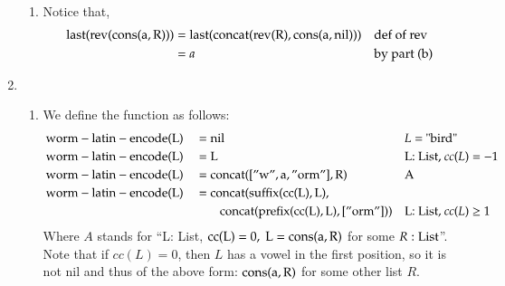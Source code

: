 \documentclass[12pt]{article}
\theoremstyle{definitionstyle}
\DeclareMathOperator{\wormlatinencode}{worm-latin-encode}
\begin{document}
\begin{enumerate}[leftmargin=\labelsep]
\begin{enumerate}[label=(\alph*)]
            \item Notice that,
            \begin{align*}
                \begin{aligned}
                    \rm last(rev(cons(a, R))) &= \rm last(concat(rev(R), cons(a, nil))) && \text{def of rev} \\
                    &= a && \text{by part (b)}
                \end{aligned}
            \end{align*}
        \end{enumerate}
        \item \begin{enumerate}[label=(\alph*)]
            \item We define the function as follows:
            \begin{align*}
                \begin{aligned}
                    & \rm \wormlatinencode(L) &&= \rm nil && \text{$L=$ "bird"} \\
                    & \rm \wormlatinencode(L) &&= \rm L && \text{L: List, $cc(L) = -1$} \\
                    & \rm \wormlatinencode(L) &&= \rm concat(["w", a, "orm"], R) && \text{A} \\
                    & \rm \wormlatinencode(L) &&= \rm concat(suffix(cc(L), L), 
                    \\ &&&\rm \qquad concat(prefix(cc(L), L), ["orm"])) && \text{L: List, $cc(L) \geq 1$}
                \end{aligned}
            \end{align*}
            Where $A$ stands for ``L: List, $\rm cc(L) = 0,\;L = \rm cons(a, R)$ for some $R: \rm List$''. Note that if $cc(L) = 0$, then $L$ has a vowel in the first position, so it is not nil and thus of the above form: $\rm cons(a, R)$ for some other list $R$.
        \end{enumerate}
    \end{enumerate}
\end{document}
